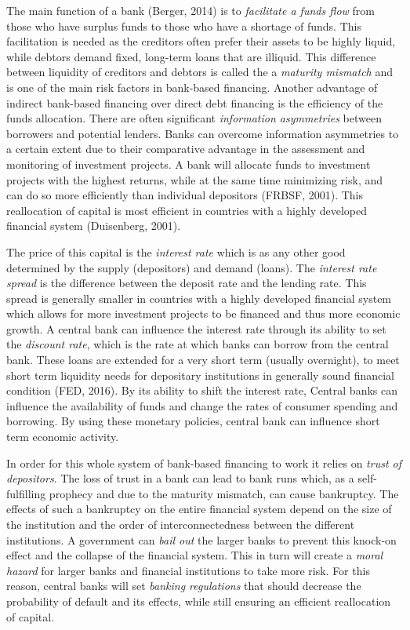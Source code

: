 \documentclass[DIV=calc, paper=a4, fontsize=11pt, twocolumn]{scrartcl}	 %
\begin{document}
The main function of a bank (Berger, 2014) is to \textit{facilitate a funds flow} from those who have surplus funds to those who have a shortage of funds. This facilitation is needed as the creditors often prefer their assets to be highly liquid, while debtors demand fixed, long-term loans that are illiquid. This difference between liquidity of creditors and debtors is called the a \textit{maturity mismatch} and is one of the main risk factors in bank-based financing. Another advantage of indirect bank-based financing over direct debt financing is the efficiency of the funds allocation. There are often significant \textit{information asymmetries} between borrowers and potential lenders. Banks can overcome information asymmetries to a certain extent due to their comparative advantage in the assessment and monitoring of investment projects. A bank will allocate funds to investment projects with the highest returns, while at the same time minimizing risk, and can do so more efficiently than individual depositors (FRBSF, 2001). This reallocation of capital is most efficient in countries with a highly developed financial system (Duisenberg, 2001). 

The price of this capital is the \textit{interest rate} which is as any other good determined by the supply (depositors) and demand (loans). The \textit{interest rate spread} is the difference between the deposit rate and the lending rate. This spread is generally smaller in countries with a highly developed financial system which allows for more investment projects to be financed and thus more economic growth. A central bank can influence the interest rate through its ability to set the \textit{discount rate}, which is the rate at which banks can borrow from the central bank. These loans are extended for a very short term (usually overnight), to meet short term liquidity needs for depositary institutions in generally sound financial condition (FED, 2016). By its ability to shift the interest rate, Central banks can influence the availability of funds and change the rates of consumer spending and borrowing. By using these monetary policies, central bank can influence short term economic activity.

In order for this whole system of bank-based financing to work it relies on \textit{trust of depositors}. The loss of trust in a bank can lead to bank runs which, as a self-fulfilling prophecy and due to the maturity mismatch, can cause bankruptcy. The effects of such a bankruptcy on the entire financial system depend on the size of the institution and the order of interconnectedness between the different institutions. A government can \textit{bail out} the larger banks to prevent this knock-on effect and the collapse of the financial system. This in turn will create a \textit{moral hazard} for larger banks and financial institutions to take more risk. For this reason, central banks will set \textit{ banking regulations} that should decrease the probability of default and its effects, while still ensuring an efficient reallocation of capital. 
\end{document}
